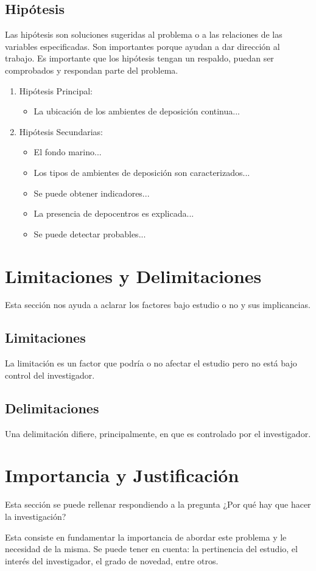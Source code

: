 \subsection{Hipótesis}
Las hipótesis son soluciones sugeridas al problema o a las relaciones de las variables especificadas. Son importantes porque ayudan a dar dirección al trabajo. Es importante que los hipótesis tengan un respaldo, puedan ser comprobados y respondan parte del problema.

\begin{enumerate}

\item Hipótesis Principal:
\begin{itemize}
\item La ubicación de los ambientes de deposición continua...
\end{itemize}

\item Hipótesis Secundarias:
\begin{itemize}
\item El fondo marino...
\item Los tipos de ambientes de deposición son caracterizados...
\item Se puede obtener indicadores...
\item La presencia de depocentros es explicada...
\item Se puede detectar probables...
\end{itemize}
\end{enumerate}


\section{Limitaciones y Delimitaciones}

Esta sección nos ayuda a aclarar los factores bajo estudio o no y sus implicancias.

\subsection{Limitaciones}

La limitación es un factor que podría o no afectar el estudio pero no está bajo control del investigador.

\subsection{Delimitaciones}

Una delimitación difiere, principalmente, en que es controlado por el investigador.

\section{Importancia y Justificación}

Esta sección se puede rellenar respondiendo a la pregunta ¿Por qué hay que hacer la investigación?

Esta consiste en fundamentar la importancia de abordar este problema y le necesidad de la misma. Se puede tener en cuenta: la pertinencia del estudio, el interés del investigador, el grado de novedad, entre otros.

 
